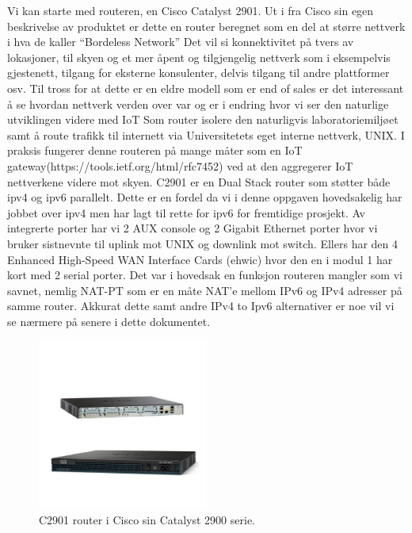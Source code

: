 \documentclass{article}
\begin{document}
Vi kan starte med routeren, en Cisco Catalyst 2901. Ut i fra Cisco sin egen beskrivelse av produktet er dette en router beregnet som en del at større nettverk i hva de kaller “Bordeless Network”\cite{cisco2901} %
Det vil si konnektivitet på tvers av lokasjoner, til skyen og et mer åpent og tilgjengelig nettverk som i eksempelvis gjestenett, tilgang for eksterne konsulenter, delvis tilgang til andre plattformer osv. Til tross for at dette er en eldre modell som er end of sales er det interessant å se hvordan nettverk verden over var og er i endring hvor vi ser den naturlige utviklingen videre med IoT\cite{ciscosky} %
Som router isolere den naturligvis laboratoriemiljøet samt å route trafikk til internett via Universitetets eget interne nettverk, UNIX. I praksis fungerer denne routeren på mange måter som en IoT gateway(https://tools.ietf.org/html/rfc7452) ved at den aggregerer IoT nettverkene videre mot skyen. C2901 er en Dual Stack router som støtter både ipv4 og ipv6 parallelt. Dette er en fordel da vi i denne oppgaven hovedsakelig har jobbet over ipv4 men har lagt til rette for ipv6 for fremtidige prosjekt. Av integrerte porter har vi 2 AUX console og 2 Gigabit Ethernet porter hvor vi bruker sistnevnte til uplink mot UNIX og downlink mot switch. Ellers har den 4 Enhanced High-Speed WAN Interface Cards (ehwic) hvor den en i modul 1 har kort med 2 serial porter. Det var i hovedsak en funksjon routeren mangler som vi savnet, nemlig NAT-PT som er en måte NAT'e mellom IPv6 og IPv4 adresser på samme router. Akkurat dette samt andre IPv4 to Ipv6 alternativer er noe vil vi se nærmere på senere i dette dokumentet. 


\begin{figure}[!ht]
  \centering
      \includegraphics[width=0.5\textwidth]{C2901}
  \caption {C2901 router i Cisco sin Catalyst 2900 serie.}
\end{figure}
\end{document}
